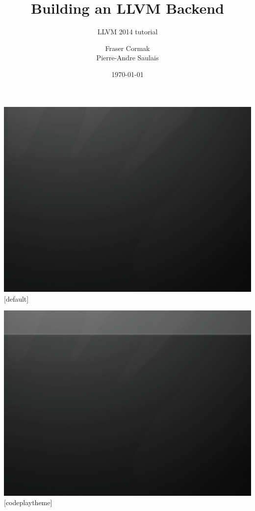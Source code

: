 \documentclass[t]{beamer}
\title{Building an LLVM Backend}
\subtitle{LLVM 2014 tutorial}
\author{Fraser Cormak \\ Pierre-Andre Saulais}
\institute{Codeplay Software @codeplaysoft}
\date{\today}
\begin{document}
{\includegraphics[width=\paperwidth,height=\paperheight]{dark_background_title.png}}
[default]

\begin{frame}
\vspace{2cm}
  \titlepage
  \vspace{10cm}
\end{frame}


 {\includegraphics[width=\paperwidth,height=\paperheight]{dark_background.png}}
[codeplaytheme]
\end{document}

